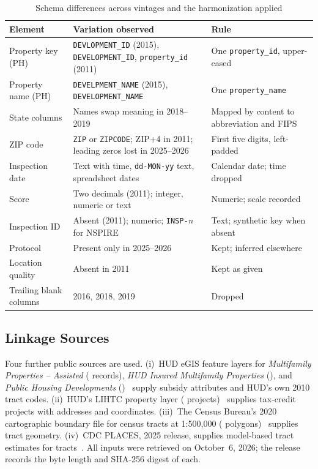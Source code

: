 \documentclass[10pt,twocolumn,letterpaper]{article}
\newcommand{\col}[1]{\texttt{\small #1}}
\begin{document}
\begin{table}[t]
\caption{Schema differences across vintages and the harmonization applied}\label{tab:schema}
\centering\footnotesize
\begin{tabular}{@{}p{}p{}p{}@{}}
\toprule
Element & Variation observed & Rule \\
\midrule
Property key (PH) & \col{DEVLOPMENT\_ID} (2015), \col{DEVELOPMENT\_ID}, \col{property\_id} (2011) & One \col{property\_id}, upper-cased \\
Property name (PH) & \col{DEVELPMENT\_NAME} (2015), \col{DEVELOPMENT\_NAME} & One \col{property\_name} \\
State columns & Names swap meaning in 2018--2019 & Mapped by content to abbreviation and FIPS \\
ZIP code & \col{ZIP} or \col{ZIPCODE}; ZIP+4 in 2011; leading zeros lost in 2025--2026 & First five digits, left-padded \\
Inspection date & Text with time, \col{dd-MON-yy} text, spreadsheet dates & Calendar date; time dropped \\
Score & Two decimals (2011); integer, numeric or text & Numeric; scale recorded \\
Inspection ID & Absent (2011); numeric; \col{INSP-}\emph{n} for NSPIRE & Text; synthetic key when absent \\
Protocol & Present only in 2025--2026 & Kept; inferred elsewhere \\
Location quality & Absent in 2011 & Kept as given \\
Trailing blank columns & 2016, 2018, 2019 & Dropped \\
\bottomrule
\end{tabular}
\end{table}

\subsection{Linkage Sources}
Four further public sources are used. (i)~HUD eGIS feature layers for \emph{Multifamily Properties -- Assisted} (\mfAssistedRows{} records), \emph{HUD Insured Multifamily Properties} (\mfInsuredRows{}), and \emph{Public Housing Developments} (\phDevRows{})~\cite{hudegis} supply subsidy attributes and HUD's own 2010 tract codes. (ii)~HUD's LIHTC property layer (\lihtcRows{} projects)~\cite{hudlihtc} supplies tax-credit projects with addresses and coordinates. (iii)~The Census Bureau's 2020 cartographic boundary file for census tracts at 1:500,000 (\tractPolygons{} polygons)~\cite{censuscb} supplies tract geometry. (iv)~CDC PLACES, 2025 release, supplies model-based tract estimates for \placesTractsAll{} tracts~\cite{greenlund2022,places2025}. All inputs were retrieved on October~6, 2026; the release records the byte length and SHA-256 digest of each.
\end{document}

